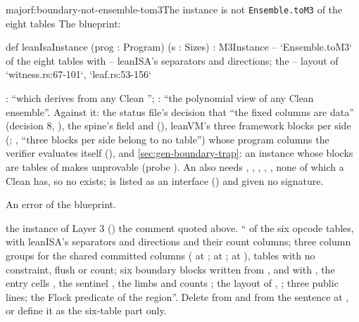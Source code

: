 \begin{finding}{major}{f:boundary-not-ensemble-tom3}{The instance is not \texttt{Ensemble.toM3} of the eight tables}
 The blueprint:
\begin{leancode}
def leanIsaInstance (prog : Program) (s : Sizes) : M3Instance   -- `Ensemble.toM3` of the eight tables with
                                                               -- leanISA's separators and directions; the
                                                               -- layout of `witness.rs:67-101`, `leaf.rs:53-156`
\end{leancode}
: \enquote{which  derives from any Clean };
: \enquote{the polynomial view of any Clean ensemble}. Against it: the status file's
decision that \enquote{the fixed columns are  data} (decision 8,
), the spine's  field and 
(), leanVM's three framework blocks per side
(; , \enquote{three blocks per side
belong to no table}) whose program columns the verifier evaluates itself (),
and \cref{sec:gen-boundary-trap}: an instance whose blocks are tables of  makes
 unprovable (probe ). An  also
needs , , , , , none of which a Clean
 has, so no  exists;
 is listed as an interface () and given no signature.

 An error of the blueprint.

\begin{change}{the instance of Layer 3 ()}
\asis the comment quoted above.
\asproposed \enquote{ of the six opcode tables, with leanISA's separators
and directions and their count columns; three column groups for the shared committed columns
( at ;  at
;  at ), tables with no constraint, flush or
count; six boundary blocks written from ,  and
 with , the entry cells
, the sentinel
, the limbs and counts ; the layout of
, ; three public lines;  the Flock
predicate of the region}. Delete  from  and from the
sentence at , or define it as the six-table part only.
\end{change}
\end{finding}

